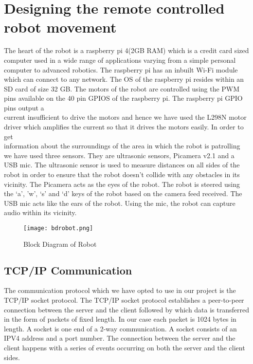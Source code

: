 \section{Designing the remote controlled robot movement}
The heart of the robot is a raspberry pi 4(2GB RAM) which is a credit card sized computer used in a wide range of applications varying from a simple personal \\computer to advanced robotics.  The raspberry pi has an inbuilt Wi-Fi module which can connect to any network. The OS of the raspberry pi resides within an SD card of size 32 GB. The motors of the robot are controlled using the PWM pins available on the 40 pin GPIOS of the raspberry pi. The raspberry pi GPIO pins output a \\current insufficient to drive the motors and hence we have used the L298N motor driver which amplifies the current so that it drives the motors easily. In order to get \\information about the surroundings of the area in which the robot is patrolling we have used three sensors. They are ultrasonic sensors, Picamera v2.1 and a USB mic. The ultrasonic sensor is used to measure distances on all sides of the robot in order to ensure that the robot doesn’t collide with any obstacles in its vicinity. The Picamera acts as the eyes of the robot. The robot is steered using the ‘a’, ’w’, ‘s’ and ‘d’ keys of the robot based on the camera feed received. The USB mic acts like the ears of the robot. Using the mic, the robot can capture audio within its vicinity.
\vspace{0.5cm}
\begin{figure}[h]
\centering
\texttt{[image: bdrobot.png]}
\caption{Block Diagram of Robot}
\end{figure}
\subsection{TCP/IP Communication}
The communication protocol which we have opted to use in our project is the TCP/IP socket protocol.  The TCP/IP socket protocol establishes a peer-to-peer connection between the server and the client followed by which data is transferred in the form of packets of fixed length. In our case each packet is 1024 bytes in length. A socket is one end of a 2-way communication. A socket consists of an IPV4 address and a port number. The connection between the server and the client happens with a series of events occurring on both the server and the client sides.
